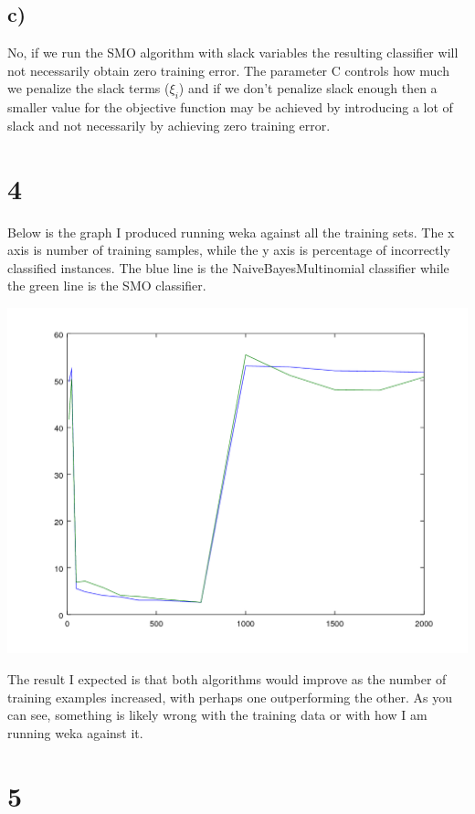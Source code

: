 \documentclass[11pt]{article}
\begin{document}
\subsection*{c)}
No, if we run the SMO algorithm with slack variables the resulting classifier will not necessarily obtain zero training error. The parameter C controls how much we penalize the slack terms ($\xi_i$) and if we don't penalize slack enough then a smaller value for the objective function may be achieved by introducing a lot of slack and not necessarily by achieving zero training error.

\section*{4}
Below is the graph I produced running weka against all the training sets. The x axis is number of training samples, while the y axis is percentage of incorrectly classified instances. The blue line is the NaiveBayesMultinomial classifier while the green line is the SMO classifier.

\includegraphics[width=\textwidth]{q4/num_examples_vs_error.png}

The result I expected is that both algorithms would improve as the number of training examples increased, with perhaps one outperforming the other. As you can see, something is likely wrong with the training data or with how I am running weka against it. 

\section*{5}
\end{document}
